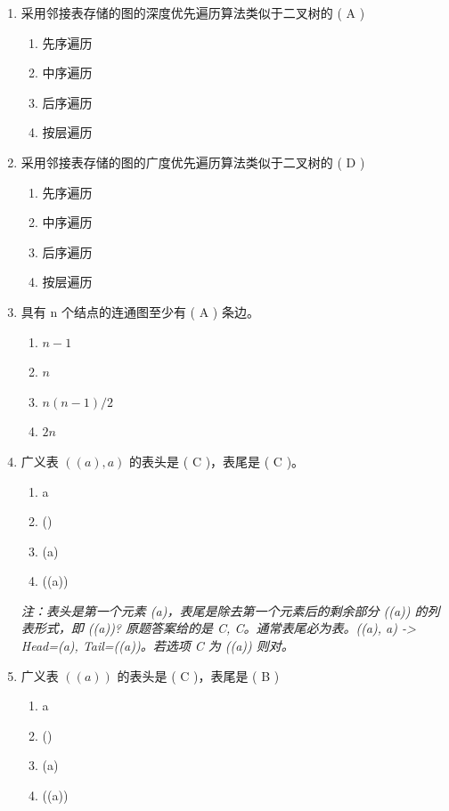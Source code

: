 \documentclass[12pt, a4paper]{article}
\begin{document}
\begin{enumerate}[label=\arabic*.]
    \item 采用邻接表存储的图的深度优先遍历算法类似于二叉树的 ( A )
    \begin{enumerate}
        \item 先序遍历
        \item 中序遍历
        \item 后序遍历
        \item 按层遍历
    \end{enumerate}

    \item 采用邻接表存储的图的广度优先遍历算法类似于二叉树的 ( D )
    \begin{enumerate}
        \item 先序遍历
        \item 中序遍历
        \item 后序遍历
        \item 按层遍历
    \end{enumerate}

    \item 具有 n 个结点的连通图至少有 ( A ) 条边。
    \begin{enumerate}
        \item $n-1$
        \item $n$
        \item $n(n-1)/2$
        \item $2n$
    \end{enumerate}

    \item 广义表 $((a), a)$ 的表头是 ( C )，表尾是 ( C )。
    \begin{enumerate}
        \item a
        \item ()
        \item (a)
        \item ((a))
    \end{enumerate}
    \textit{注：表头是第一个元素 (a)，表尾是除去第一个元素后的剩余部分 ((a)) 的列表形式，即 ((a))? 原题答案给的是 C, C。通常表尾必为表。((a), a) -> Head=(a), Tail=((a))。若选项 C 为 ((a)) 则对。}

    \item 广义表 $((a))$ 的表头是 ( C )，表尾是 ( B )
    \begin{enumerate}
        \item a
        \item ()
        \item (a)
        \item ((a))
    \end{enumerate}


\end{enumerate}
\end{document}
